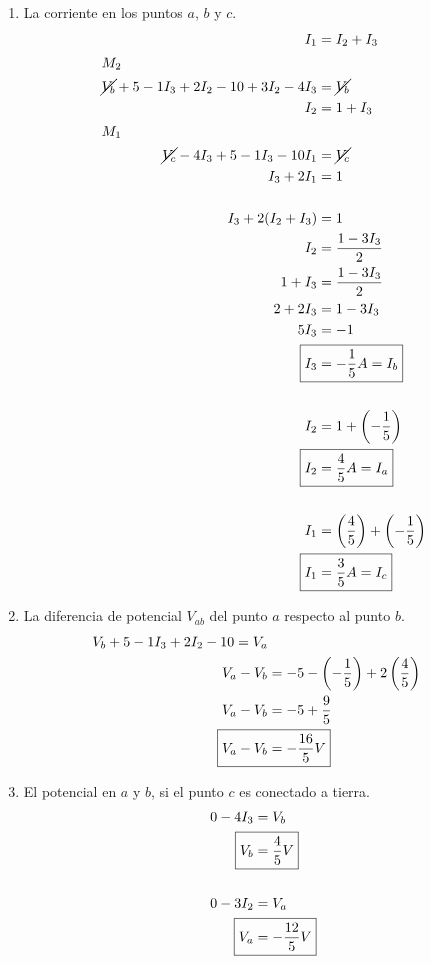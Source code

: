 \documentclass[../main.tex]{subfiles}
\begin{document}
\begin{enumerate}[label=\alph*.]
	\item La corriente en los puntos $a$, $b$ y $c$.
		\begin{align*}
			I_1 &= I_2 + I_3\\
			\intertext{$M_2$}
			\cancel{V_b} + 5 - 1I_3 + 2I_2 -10 + 3I_2 - 4I_3 &= \cancel{V_b}\\
			I_2 &= 1 + I_3\\
			\intertext{$M_1$}
			\cancel{V_c} - 4I_3 + 5 - 1I_3 - 10I_1 &= \cancel{V_c}\\
			I_3 + 2I_1 &= 1\\
			\\
			I_3 +2(I_2+I_3) &= 1\\
			I_2 &= \frac{1-3I_3}{2}\\
			1+ I_3 &= \frac{1-3I_3}{2}\\
			2 + 2I_3 &= 1 - 3I_3\\
			5I_3 &= -1\\
			\Aboxed
			{
				I_3 &= -\frac{1}{5}A = I_b
			}\\
			\\
			I_2 &= 1 + \left(- \frac{1}{5} \right)\\
			\Aboxed
			{
				I_2 &= \frac{4}{5}A = I_a
			}\\
			\\
			I_1 &= \left( \frac{4}{5} \right) + \left( - \frac{1}{5}  \right)\\
			\Aboxed
			{
				I_1 &= \frac{3}{5}A = I_c
			}
		\end{align*}
	\item La diferencia de potencial $V_{ab}$ del punto $a$ respecto al
		punto $b$.
		\begin{align*}
			V_b + 5 - 1I_3 + 2I_2 - 10 = V_a\\
			V_a - V_b &= -5 - \left( -\frac{1}{5} \right) +
			2 \left( \frac{4}{5} \right)\\
			V_a - V_b &= -5 + \frac{9}{5}\\
			\Aboxed
			{
				V_a - V_b &= -\frac{16}{5}V
			}
		\end{align*}
	\item El potencial en $a$ y $b$, si el punto $c$ es conectado a tierra.
		\begin{align*}
			0 - 4I_3 &= V_b\\
			\Aboxed
			{
				V_b &= \frac{4}{5} V
			}\\
			\\
			0 - 3I_2 &= V_a\\
			\Aboxed
			{
				V_a &= - \frac{12}{5} V
			}
		\end{align*}
\end{enumerate}
\end{document}
